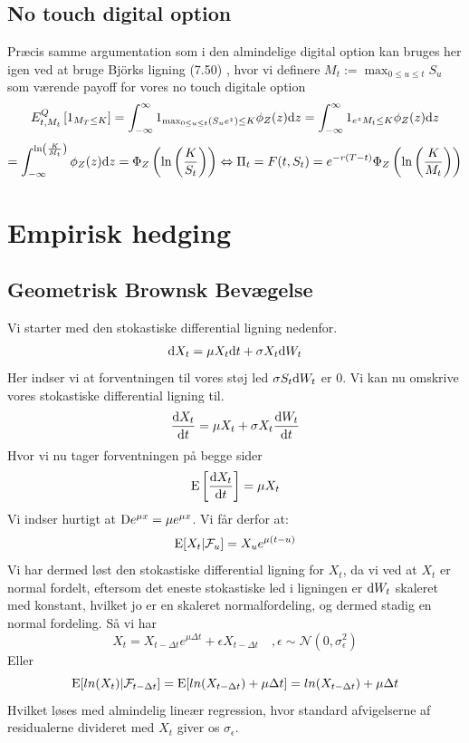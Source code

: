 \documentclass{article}
\theoremstyle{definition}
\theoremstyle{remark}
\newcommand\ens{\Leftrightarrow}
\begin{document}
\subsection{No touch digital option}
Præcis samme argumentation som i den almindelige digital option kan bruges her igen ved at bruge Björks ligning (7.50) \cite{Bjork2020}, hvor vi definere $M_t:=\max_{0\leq u\leq t}S_u$ som værende payoff for vores no touch digitale option
$$E^Q_{t,M_t}\left[1_{M_T\leq K}\right]=\int_{-\infty}^{\infty}1_{\max_{0\leq u\leq t} (S_ue^{z})\leq K}\phi_Z(z)\text dz=\int_{-\infty}^{\infty}1_{e^{z}M_t\leq K}\phi_Z(z)\text dz$$
$$=\int_{-\infty}^{\ln\left(\frac K{M_t}\right)}\phi_Z(z)\text d z=\Phi_Z\left(\ln\left(\frac{K}{S_t}\right)\right)\ens \Pi_t=F(t,S_t)=e^{-r(T-t)}\Phi_Z\left(\ln\left(\frac{K}{M_t}\right)\right)$$

\section{Empirisk hedging}
\subsection{Geometrisk Brownsk Bevægelse}
Vi starter med den stokastiske differential ligning nedenfor.
$$\text d X_t =  \mu X_t\text dt+\sigma X_t \text dW_t$$
Her indser vi at forventningen til vores støj led $\sigma S_t\text d W_t$ er 0. Vi kan nu omskrive vores stokastiske differential ligning til.
$$\frac{\text d X_t}{\text dt} =  \mu X_t+\sigma X_t \frac{\text dW_t}{\text dt}$$
Hvor vi nu tager forventningen på begge sider
$$\text E\left[\frac{\text d X_t}{\text dt}\right] =  \mu X_t$$
Vi indser hurtigt at $\text De^{\mu x}=\mu e^{\mu x}$. Vi får derfor at:
$$\text E[X_t|\mathcal F_u]=X_ue^{\mu (t-u)}$$
Vi har dermed løst den stokastiske differential ligning for $X_t$, da vi ved at $X_t$ er normal fordelt, eftersom det eneste stokastiske led i ligningen er $\text d W_t$ skaleret med konstant, hvilket jo er en skaleret normalfordeling, og dermed stadig en normal fordeling. Så vi har
$$X_t = X_{t-\Delta t}e^{\mu \Delta t}+\epsilon X_{t-\Delta t}\quad,\epsilon\sim\mathcal N(0,\sigma_\epsilon^2)$$
Eller
$$\text E[ln(X_t)|\mathcal F_{t-\Delta t}]=\text E[ln(X_{t-\Delta t})+\mu \Delta t]=ln(X_{t-\Delta t})+\mu \Delta t $$
Hvilket løses med almindelig lineær regression, hvor standard afvigelserne af residualerne divideret med $X_t$ giver os $\sigma_\epsilon$.
\end{document}
